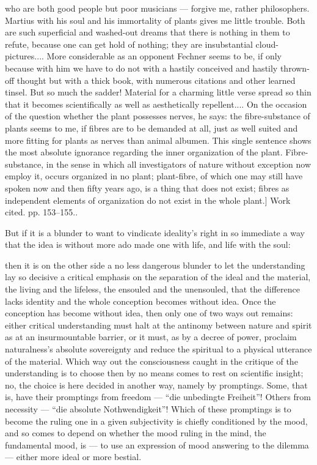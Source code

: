 \documentclass[12pt,a4paper]{book}
\begin{document}
{who are both good people but poor musicians --- forgive me, rather philosophers.
Martius with his soul and his immortality of plants gives me little trouble. Both
are such superficial and washed-out dreams that there is nothing in them to refute,
because one can get hold of nothing; they are insubstantial cloud-pictures.... More
considerable as an opponent Fechner seems to be, if only because with him we have to
do not with a hastily conceived and hastily thrown-off thought but with a thick
book, with numerous citations and other learned tinsel. But so much the sadder!
Material for a charming little verse spread so thin that it becomes scientifically
as well as aesthetically repellent.... On the occasion of the question whether the
plant possesses nerves, he says: the fibre-substance of plants seems to me, if
fibres are to be demanded at all, just as well suited and more fitting for plants as
nerves than animal albumen. This single sentence shows the most absolute ignorance
regarding the inner organization of the plant. Fibre-substance, in the sense in
which all investigators of nature without exception now employ it, occurs organized
in no plant; plant-fibre, of which one may still have spoken now and then fifty
years ago, is a thing that does not exist; fibres as independent elements of
organization do not exist in the whole plant.] Work cited. pp. 153--155.}.

But if it is a blunder to want to vindicate ideality's right in so immediate a way
that the idea is without more ado made one with life, and life with the soul:

then it is on the other side a no less dangerous blunder to let the understanding
lay so decisive a critical emphasis on the separation of the ideal and the
material, the living and the lifeless, the ensouled and the unensouled, that the
difference lacks identity and the whole conception becomes without idea. Once the
conception has become without idea, then only one of two ways out remains: either
critical understanding must halt at the antinomy between nature and spirit as at an
insurmountable barrier, or it must, as by a decree of power, proclaim naturalness's
absolute sovereignty and reduce the spiritual to a physical utterance of the
material. Which way out the consciousness caught in the critique of the
understanding is to choose then by no means comes to rest on scientific insight;
no, the choice is here decided in another way, namely by promptings. Some, that is,
have their promptings from freedom --- ``die unbedingte Freiheit''! Others from
necessity --- ``die absolute Nothwendigkeit''! Which of these promptings is to
become the ruling one in a given subjectivity is chiefly conditioned by the mood,
and so comes to depend on whether the mood ruling in the mind, the fundamental
mood, is --- to use an expression of mood answering to the dilemma --- either more
ideal or more bestial.
\end{document}
